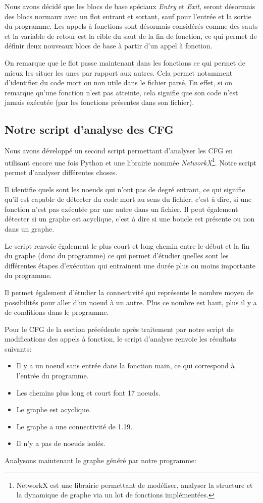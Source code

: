 Nous avons décidé que les blocs de base spéciaux \textit{Entry} et \textit{Exit}, seront désormais des blocs normaux avec un flot entrant et sortant, sauf pour l'entrée et la sortie du programme. Les appels à fonctions sont désormais considérés comme des sauts et la variable de retour est la cible du saut de la fin de fonction, ce qui permet de définir deux nouveaux blocs de base à partir d'un appel à fonction.

On remarque que le flot passe maintenant dans les fonctions ce qui permet de mieux les situer les unes par rapport aux autres. Cela permet notamment d'identifier du code mort ou non utile dans le fichier parsé. En effet, si on remarque qu'une fonction n'est pas atteinte, cela signifie que son code n'est jamais exécutée (par les fonctions présentes dans son fichier).

\subsection{Notre script d'analyse des CFG}
Nous avons développé un second script permettant d'analyser les CFG en utilisant encore une fois Python et une librairie nommée \textit{NetworkX}\footnote{NetworkX est une librairie permettant de modéliser, analyser la structure et la dynamique de graphe via un lot de fonctions implémentées.}. Notre script permet d'analyser différentes choses.

Il identifie quels sont les noeuds qui n'ont pas de degré entrant, ce qui signifie qu'il est capable de détecter du code mort au sens du fichier, c'est à dire, si une fonction n'est pas exécutée par une autre dans un fichier. Il peut également détecter si un graphe est acyclique, c'est à dire si une boucle est présente ou non dans un graphe.

Le script renvoie également le plus court et long chemin entre le début et la fin du graphe (donc du programme) ce qui permet d'étudier quelles sont les différentes étapes d'exécution qui entrainent une durée plus ou moins importante du programme.

Il permet également d'étudier la connectivité qui représente le nombre moyen de possibilités pour aller d'un noeud à un autre. Plus ce nombre est haut, plus il y a de conditions dans le programme.

Pour le CFG de la section précédente après traitement par notre script de modifications des appels à fonction, le script d'analyse renvoie les résultats suivants:
\begin{itemize}
    \item Il y a un noeud sans entrée dans la fonction main, ce qui correspond à l'entrée du programme.
    \item Les chemins plus long et court font 17 noeuds.
    \item Le graphe est acyclique.
    \item Le graphe a une connectivité de 1.19.
    \item Il n'y a pas de noeuds isolés.
\end{itemize}
Analysons maintenant le graphe généré par notre programme:


